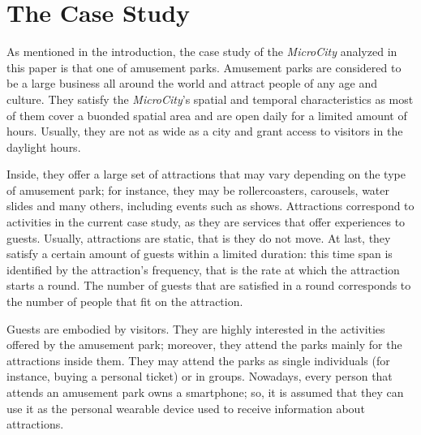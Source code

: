 \section{The Case Study}
\label{sec:case}

As mentioned in the introduction, the case study of the \textit{MicroCity} analyzed in this paper is that one of amusement parks. Amusement parks are considered to be a large business all around the world and attract people of any age and culture. They satisfy the \textit{MicroCity}'s spatial and temporal characteristics as most of them cover a buonded spatial area and are open daily for a limited amount of hours. Usually, they are not as wide as a city and grant access to visitors in the daylight hours.

Inside, they offer a large set of attractions that may vary depending on the type of amusement park; for instance, they may be rollercoasters, carousels, water slides and many others, including events such as shows. Attractions correspond to activities in the current case study, as they are services that offer experiences to guests. Usually, attractions are static, that is they do not move. At last, they satisfy a certain amount of guests within a limited duration: this time span is identified by the attraction's frequency, that is the rate at which the attraction starts a round. The number of guests that are satisfied in a round corresponds to the number of people that fit on the attraction.

Guests are embodied by visitors. They are highly interested in the activities offered by the amusement park; moreover, they attend the parks mainly for the attractions inside them. They may attend the parks as single individuals (for instance, buying a personal ticket) or in groups. Nowadays, every person that attends an amusement park owns a smartphone; so, it is assumed that they can use it as the personal wearable device used to receive information about attractions.
